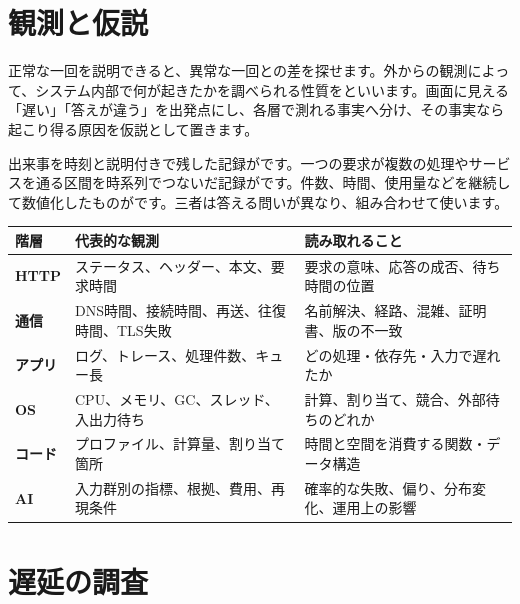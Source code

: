 \par
\endgroup
\par
\endgroup


\section{観測と仮説}
\label{sec:07-practice-07}

正常な一回を説明できると、異常な一回との差を探せます。外からの観測によって、システム内部で何が起きたかを調べられる性質をといいます。画面に見える「遅い」「答えが違う」を出発点にし、各層で測れる事実へ分け、その事実なら起こり得る原因を仮説として置きます。

出来事を時刻と説明付きで残した記録がです。一つの要求が複数の処理やサービスを通る区間を時系列でつないだ記録がです。件数、時間、使用量などを継続して数値化したものがです。三者は答える問いが異なり、組み合わせて使います。

\begingroup
  \noindent
  \begin{tabularx}{\textwidth}{@{}>{\bfseries}p{19mm}YY@{}}
    \toprule
    階層 & 代表的な観測 & 読み取れること \\
    \midrule
    HTTP & ステータス、ヘッダー、本文、要求時間 & 要求の意味、応答の成否、待ち時間の位置 \\
    通信 & DNS時間、接続時間、再送、往復時間、TLS失敗 & 名前解決、経路、混雑、証明書、版の不一致 \\
    アプリ & ログ、トレース、処理件数、キュー長 & どの処理・依存先・入力で遅れたか \\
    OS & CPU、メモリ、GC、スレッド、入出力待ち & 計算、割り当て、競合、外部待ちのどれか \\
    コード & プロファイル、計算量、割り当て箇所 & 時間と空間を消費する関数・データ構造 \\
    AI & 入力群別の指標、根拠、費用、再現条件 & 確率的な失敗、偏り、分布変化、運用上の影響 \\
    \bottomrule
  \end{tabularx}
  \vspace{1mm}
\par
\endgroup


\section{遅延の調査}
\label{sec:07-practice-08}

